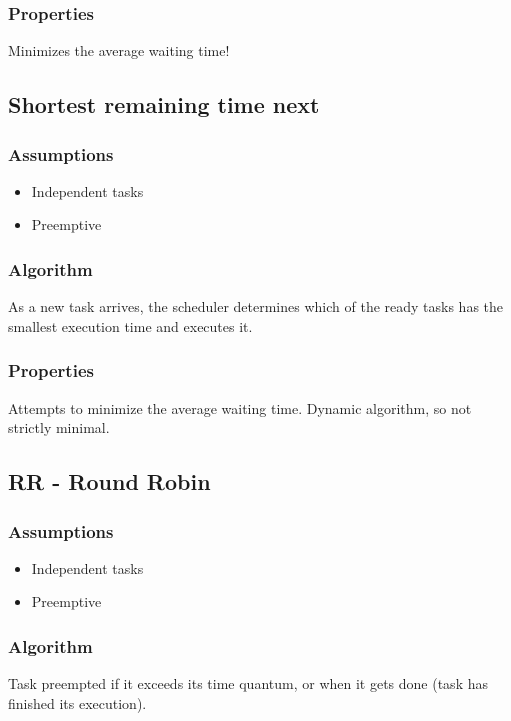 \subsubsection{Properties}
Minimizes the average waiting time!


\subsection{Shortest remaining time next}

\subsubsection{Assumptions}
\begin{itemize}[noitemsep]
\item Independent tasks
\item Preemptive
\end{itemize}

\subsubsection{Algorithm}
As a new task arrives, the scheduler determines which of the ready tasks has the smallest execution time and executes it.

\subsubsection{Properties}
Attempts to minimize the average waiting time. Dynamic algorithm, so not strictly minimal.



\subsection{RR - Round Robin}

\subsubsection{Assumptions}
\begin{itemize}[noitemsep]
\item Independent tasks
\item Preemptive
\end{itemize}

\subsubsection{Algorithm}
Task preempted if it exceeds its time quantum, or when it gets done (task has finished its execution).





